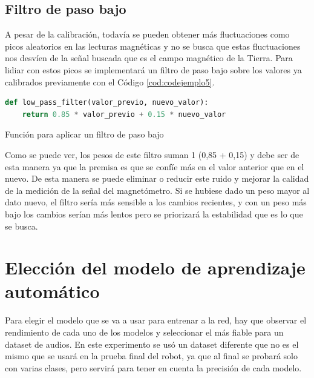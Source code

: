 \subsection{Filtro de paso bajo}
\label{subsec:filtro_paso_bajo}

A pesar de la calibración, todavía se pueden obtener más fluctuaciones como picos aleatorios en las lecturas magnéticas y no se busca que estas fluctuaciones nos desvíen de la señal buscada que es el campo magnético de la Tierra. Para lidiar con estos picos se implementará un filtro de paso bajo sobre los valores ya calibrados previamente con el Código \ref{cod:codejemplo5}.

\begin{code}[H]
\begin{lstlisting}[language=Python]
def low_pass_filter(valor_previo, nuevo_valor):
    return 0.85 * valor_previo + 0.15 * nuevo_valor
\end{lstlisting}
\caption[Función para aplicar un filtro de paso bajo]{Función para aplicar un filtro de paso bajo}
\label{cod:codejemplo5}
\end{code}


Como se puede ver, los pesos de este filtro suman 1 (0,85 + 0,15) y debe ser de esta manera ya que la premisa es que se confíe más en el valor anterior que en el nuevo. De esta manera se puede eliminar o reducir este ruido y mejorar la calidad de la medición de la señal del magnetómetro. Si se hubiese dado un peso mayor al dato nuevo, el filtro sería más sensible a los cambios recientes, y con un peso más bajo los cambios serían más lentos pero se priorizará la estabilidad que es lo que se busca.

\section{Elección del modelo de aprendizaje automático}
\label{sec:eleccion_modelo}

Para elegir el modelo que se va a usar para entrenar a la red, hay que observar el rendimiento de cada uno de los modelos y seleccionar el más fiable para un dataset de audios. En este experimento se usó un dataset diferente que no es el mismo que se usará en la prueba final del robot, ya que al final se probará solo con varias clases, pero servirá para tener en cuenta la precisión de cada modelo. \\

